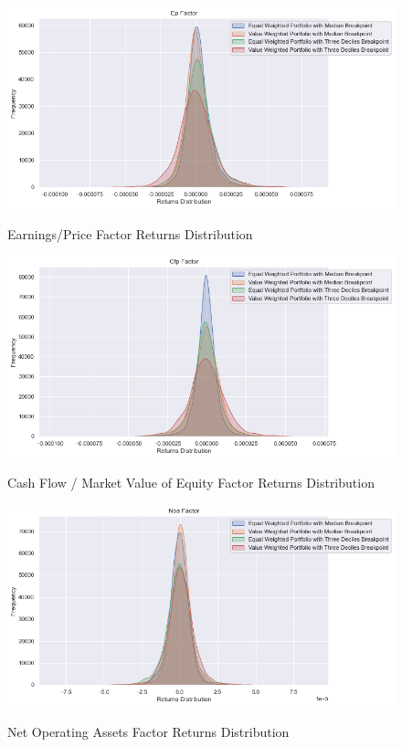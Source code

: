 \begin{figure}[H]
	\caption{Earnings/Price Factor Returns Distribution}
	\centering
	\includegraphics[scale=.63]{../../output/figures/ep.png}
	\label{fig:ep}
\end{figure}

\begin{figure}[H]
	\caption{Cash Flow / Market Value of Equity Factor Returns Distribution}
	\centering
	\includegraphics[scale=.63]{../../output/figures/cfp.png}
	\label{fig:cfp}
\end{figure}

\begin{figure}[H]
	\caption{Net Operating Assets Factor Returns Distribution}
	\centering
	\includegraphics[scale=.63]{../../output/figures/noa.png}
	\label{fig:noa}
\end{figure}

